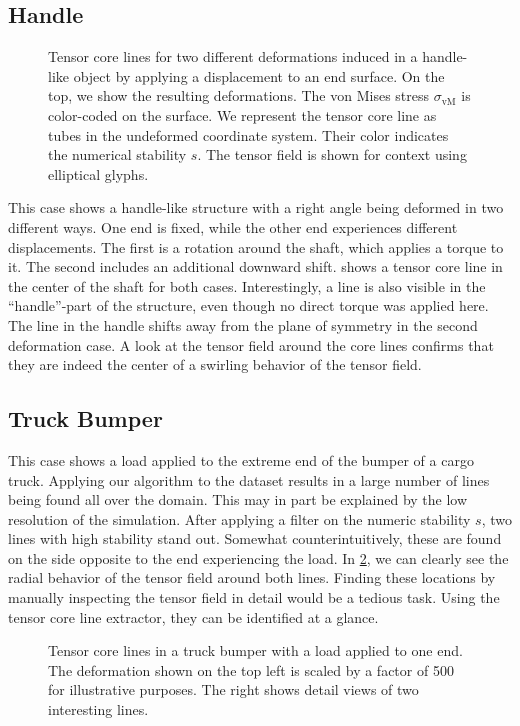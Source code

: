 \subsection{Handle} %
\label{sub:hook}
%
\begin{figure}[tp]
    \centering
    \setlength\figurewidth\textwidth
    
    \caption{Tensor core lines for two different deformations induced in a
             handle-like object by applying a displacement to an end surface. On
             the top, we show the resulting deformations. The von Mises
             stress $\sigma_{\text{vM}}$ is color-coded on the surface. We
             represent the tensor core line as tubes in the undeformed
             coordinate system. Their color indicates the numerical stability
             $s$. The tensor field is shown for context using elliptical
             glyphs.}
    \label{fig:hooks}
\end{figure}
%
This case shows a handle-like structure with a right angle being deformed in
two different ways.
%
One end is fixed, while the other end experiences different displacements.
%
The first is a rotation around the shaft, which applies a torque to it.
%
The second includes an additional downward shift.
%
 shows a tensor core line in the center of the shaft for both
cases.
%
Interestingly, a line is also visible in the ``handle''-part of the structure,
even though no direct torque was applied here.
%
The line in the handle shifts away from the plane of symmetry in the second
deformation case.
%
A look at the tensor field around the core lines confirms that they are indeed
the center of a swirling behavior of the tensor field.
%
%
\subsection{Truck Bumper} %
\label{sub:truck_bumper}
%
This case shows a load applied to the extreme end of the bumper of a cargo
truck.
%
Applying our algorithm to the dataset results in a large number of lines being
found all over the domain.
%
This may in part be explained by the low resolution of the simulation.
%
After applying a filter on the numeric stability $s$, two lines with high
stability stand out.
%
Somewhat counterintuitively, these are found on the side opposite to the end
experiencing the load.
%
In \cref{fig:truck_bumper}, we can clearly see the radial behavior of the
tensor field around both lines.
%
Finding these locations by manually inspecting the tensor field in detail would
be a tedious task.
%
Using the tensor core line extractor, they can be identified at a glance.
%
\begin{figure}[t]
    \centering
    \setlength\figurewidth\textwidth
    
    \caption{Tensor core lines in a truck bumper with a load applied to one end.
             The deformation shown on the top left is scaled by a factor of 500
             for illustrative purposes. The right shows detail views of two
             interesting lines.}
    \label{fig:truck_bumper}
\end{figure}
%
%
